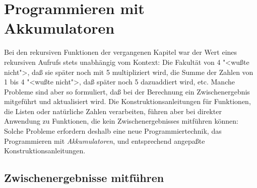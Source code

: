 
\chapter{Programmieren mit Akkumulatoren}
\label{cha:accu}

Bei den rekursiven Funktionen der vergangenen Kapitel war der Wert
eines rekursiven Aufrufs stets unabhängig vom Kontext: Die Fakultät
von 4 "<wußte nicht">, daß sie später noch mit 5 multipliziert wird,
die Summe der Zahlen von 1 bis 4 "<wußte nicht">, daß später noch 5
dazuaddiert wird, etc.  Manche Probleme sind aber so formuliert, daß
bei der Berechnung ein Zwischenergebnis mitgeführt und aktualisiert
wird.  Die Konstruktionsanleitungen für Funktionen, die Listen oder
natürliche Zahlen verarbeiten, führen aber bei direkter Anwendung zu
Funktionen, die kein Zwischenergebnisses mitführen können: Solche
Probleme erfordern deshalb eine neue Programmiertechnik, das
Programmieren mit \textit{Akkumulatoren}, und entsprechend angepaßte
Konstruktionsanleitungen.


\section{Zwischenergebnisse mitführen}
\label{sec:intermediate-results}

